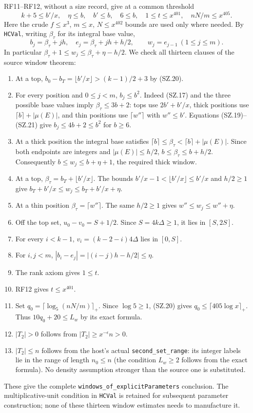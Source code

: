 \documentclass[11pt,a4paper]{article}
\numberwithin{equation}{section}
\theoremstyle{remark}\newtheorem{remark}[theorem]{Remark}
\begin{document}
RF11--RF12, without a size record, give at a common threshold
\[
 k+5\leq b'/x,\quad \eta\leq b,\quad b'\leq b,\quad
 6\leq b,\quad1\leq t\leq x^{401},\quad nN/m\leq x^{405}.
                                                                    \tag{SZ.20}
\]
Here the crude $f\leq x^3$, $m\leq x$, $N\leq x^{402}$
bounds are used only where needed. By \texttt{HCVal}, writing
$\beta_\tau$ for its integral base value,
\[
 b_j=\beta_\tau+jh,\quad e_j=\beta_\tau+jh+h/2,
       \qquad w_j=e_{j-1}\ (1\leq j\leq m).                  \tag{SZ.21}
\]
In particular
$\beta_\tau+1\leq w_j\leq\beta_\tau+\eta-h/2$.
We check all thirteen clauses of the source window theorem:
\begin{enumerate}
\item At a top,
$b_0-b_T=\lfloor b'/x\rfloor>(k-1)/2+3$ by (SZ.20).
\item For every position and $0\leq j<m$, $b_j\leq b^2$.
Indeed (SZ.17) and the three possible base values imply
$\beta_\tau\leq3b+2$: tops use $2b'+b'/x$, thick positions
use $\lceil b\rceil+|\mu(E)|$, and thin positions use
$\lceil w''\rceil$ with $w''\leq b'$. Equations
(SZ.19)--(SZ.21) give $b_j\leq4b+2\leq b^2$ for $b\geq6$.
\item At a thick position the integral base satisfies
$\lceil b\rceil\leq\beta_\tau<\lceil b\rceil+|\mu(E)|$.
Since both endpoints are integers and $|\mu(E)|\leq h/2$,
$b\leq\beta_\tau\leq b+h/2$. Consequently
$b\leq w_j\leq b+\eta+1$, the required thick window.
\item At a top,
$\beta_\tau=b_T+\lfloor b'/x\rfloor$. The bounds
$b'/x-1<\lfloor b'/x\rfloor\leq b'/x$ and $h/2\geq1$
give $b_T+b'/x\leq w_j\leq b_T+b'/x+\eta$.
\item At a thin position $\beta_\tau=\lceil w''\rceil$.
The same $h/2\geq1$ gives $w''\leq w_j\leq w''+\eta$.
\item Off the top set, $u_0-v_0=S+1/2$.
Since $S=4k\Delta\geq1$, it lies in $[S,2S]$.
\item For every $i<k-1$,
$v_i=(k-2-i)4\Delta$ lies in $[0,S]$.
\item For $i,j<m$,
$|b_i-e_j|=|(i-j)h-h/2|\leq\eta$.
\item The rank axiom gives $1\leq t$.
\item RF12 gives $t\leq x^{401}$.
\item Set $q_0=\lceil\log_5(nN/m)\rceil_+$. Since
$\log5\geq1$, (SZ.20) gives
$q_0\leq\lceil405\log x\rceil_+$. Thus
$10q_0+20\leq L_w$ by its exact formula.
\item $|T_2|>0$ follows from $|T_2|\geq x^{-\epsilon}n>0$.
\item $|T_2|\leq n$ follows from the host's actual
\texttt{second\_\allowbreak set\_\allowbreak range}: its integer labels lie in the range
of length $n_0\leq n$ (the condition $L_w\geq2$ follows from
the exact formula). No density assumption stronger than the source
one is substituted.
\end{enumerate}
These give the complete \texttt{windows\_\allowbreak of\_\allowbreak explicitParameters}
conclusion. The multiplicative-unit condition in \texttt{HCVal}
is retained for subsequent parameter construction; none of these
thirteen window estimates needs to manufacture it.
\end{document}
